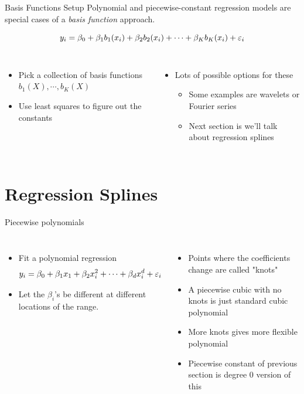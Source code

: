 \documentclass[aspectratio=169,usenames,dvipsnames]{beamer}
\newcommand{\InstructorList}[1]{
\begin{itemize}
	\color{orange}
	#1
\end{itemize}
}
\begin{document}
\begin{frame}[t]{Basis Functions Setup}
Polynomial and piecewise-constant regression models are special cases of a \textit{basis function} approach.

\begin{equation*}
	y_i = \beta_0 + \beta_1b_1(x_i) + \beta_2 b_2(x_i) + \cdots + \beta_K b_K(x_i) + \varepsilon_i
\end{equation*}

\begin{columns}
\centering
\InstructorList{
  \item Pick a collection of basis functions $b_1(X),\cdots,b_K(X)$
	\item Use least squares to figure out the constants

}

\centering

\InstructorList{
	\item Lots of possible options for these
	\InstructorList{
	  \item Some examples are wavelets or Fourier series
		\item Next section is we'll talk about regression splines
	}
}


\end{columns}

\end{frame}
\section{Regression Splines}


\begin{frame}[c]{Piecewise polynomials}

\begin{columns}
\centering
\begin{itemize}
	\item Fit a polynomial regression
\begin{equation*}
	y_i = \beta_0 + \beta_1x_1 + \beta_2x_i^2 + \cdots + \beta_dx_i^d + \varepsilon_i
\end{equation*}
\item Let the $\beta_i$'s be different at different locations of the range.
\end{itemize}
\centering
\InstructorList{
  \item Points where the coefficients change are called "knots"
	\item A piecewise cubic with no knots is just standard cubic polynomial
	\item More knots gives more flexible polynomial
	\item Piecewise constant of previous section is degree 0 version of this
}

\end{columns}

\end{frame}
\end{document}
